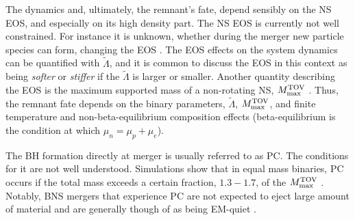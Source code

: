 The \pmerg{} dynamics and, ultimately, the remnant's fate, depend sensibly on the 
\ac{NS} \ac{EOS}, and especially on its 
high density part. 
%
The \ac{NS} \ac{EOS} is currently not well constrained. For instance it is unknown, 
whether during the merger new particle species can form, changing the \ac{EOS}
\citep[\eg][]{Fore:2019wib,Vidana:2010ip}. 
The \ac{EOS} effects on the system dynamics can be quantified with $\tilde{\Lambda}$, 
and it is common to discuss the \ac{EOS} in this context as being 
\textit{softer} or \textit{stiffer} if the $\tilde{\Lambda}$ is larger or smaller. 
%
%
Another quantity describing the \ac{EOS} is the maximum supported mass of a 
non-rotating \ac{NS}, $M_{\rm max}^{\rm TOV}$ \citep{Shibata:2016}.
%
Thus, the remnant fate depends on the binary parameters, $\tilde{\Lambda}$, 
$M_{\rm max}^{\rm TOV}$, 
and finite temperature and non-beta-equilibrium composition effects 
(beta-equilibrium is the condition at which $\mu_n = \mu_p+\mu_e$).


The \ac{BH} formation directly at merger is usually referred to as \ac{PC}. 
The conditions for it are not well understood. 
Simulations show that in equal mass binaries, \ac{PC} occurs if the total mass 
exceeds a certain fraction, $1.3-1.7$, of the $M_{\rm max}^{\rm TOV}$ 
\citep{Shibata:2005ss,Shibata:2006nm,Hotokezaka:2011dh,Bauswein:2013jpa}.
%
%
Notably, \ac{BNS} mergers that experience \ac{PC} are not expected to eject large 
amount of material and are generally though of as being \ac{EM}-quiet 
\citep{Margalit:2017dij,Bauswein:2017vtn}. 


